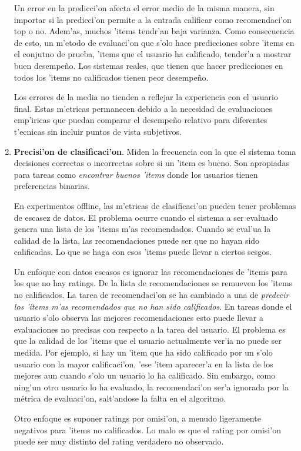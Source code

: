 \documentclass[11pt]{article}
\begin{document}
\begin{enumerate}
Un error en la predicci'on afecta el error medio de la misma manera, sin importar si la predicci'on permite a la entrada calificar como recomendaci'on top o no. Adem'as, muchos 'items tendr'an baja varianza. Como consecuencia de esto, un m'etodo de evaluaci'on que s'olo hace predicciones sobre 'items en el conjutno de prueba, 'items que el usuario ha calificado, tender'a a mostrar buen desempe\~{n}o. Los sistemas reales, que tienen que hacer predicciones en todos los 'items no calificados tienen peor desempe\~{n}o. 

Los errores de la media no tienden a reflejar la experiencia con el usuario final. Estas m'etricas permanecen debido a la necesidad de evaluaciones emp'iricas que puedan comparar el desempe\~{n}o relativo para diferentes t'ecnicas sin incluir puntos de vista subjetivos. 

\item \textbf{Precisi'on de clasificaci'on}. Miden la frecuencia con la que el sistema toma decisiones correctas o incorrectas sobre si un 'item es bueno. Son apropiadas para tareas como \textit{encontrar buenos 'items} donde los usuarios tienen preferencias binarias.

En experimentos offline, las m'etricas de clasificaci'on pueden tener problemas de escasez de datos. El problema ocurre cuando el sistema a ser evaluado genera una lista de los 'items m'as recomendados. Cuando se eval'ua la calidad de la lista, las recomendaciones puede ser que no hayan sido calificadas. Lo que se haga con esos 'items puede llevar a ciertos sesgos.

Un enfoque con datos escasos es ignorar las recomendaciones de 'items para los que no hay ratings. De la lista de recomendaciones se remueven los 'items no calificados. La tarea de recomendaci'on se ha cambiado a una de \textit{predecir los 'items m'as recomendados que no han sido calificados}. En tareas donde el usuario s'olo observa las mejores recomendaciones esto puede llevar a evaluaciones no precisas con respecto a la tarea del usuario. El problema es que la calidad de los 'items que el usuario actualmente ver'ia no puede ser medida. Por ejemplo, si hay un 'item que ha sido calificado por un s'olo usuario con la mayor calificaci'on, 'ese 'item aparecer'a en la lista de los mejores aun cuando s'olo un usuario lo ha calificado. Sin embargo, como ning'un otro usuario lo ha evaluado, la recomendaci'on ser'a ignorada por la métrica de evaluaci'on, salt'andose la falta en el algoritmo.

Otro enfoque es suponer ratings por omisi'on, a menudo ligeramente negativos para 'items no calificados. Lo malo es que el rating por omisi'on puede ser muy distinto del rating verdadero no observado.


\end{enumerate}
\end{document}
